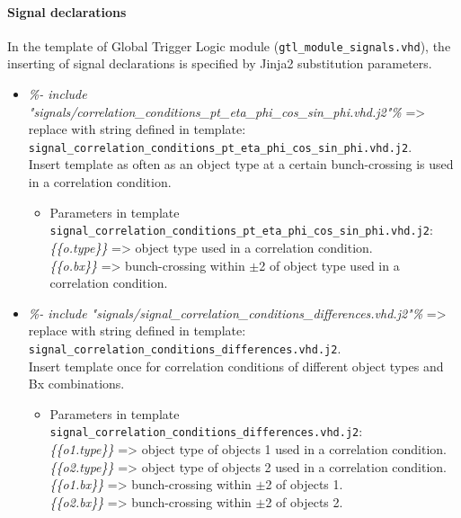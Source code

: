 \paragraph{Signal declarations}
In the template of Global Trigger Logic module (\texttt{gtl\_module\_signals.vhd}), the inserting of signal declarations is specified by Jinja2 substitution parameters.

\begin{itemize}
\item \textit{{\%- include "signals/correlation\_conditions\_pt\_eta\_phi\_cos\_sin\_phi.vhd.j2"\%}} => replace with string defined in template:\\
\texttt{signal\_correlation\_conditions\_pt\_eta\_phi\_cos\_sin\_phi.vhd.j2}.\\
Insert template as often as an object type at a certain bunch-crossing is used in a correlation condition.
    \begin{itemize}
    \item Parameters in template\\ \texttt{signal\_correlation\_conditions\_pt\_eta\_phi\_cos\_sin\_phi.vhd.j2}:\\
    \textit{\{\{o.type\}\}} => object type used in a correlation condition.\\ 
    \textit{\{\{o.bx\}\}} => bunch-crossing within $\pm$2 of object type used in a correlation condition.\\
    \end{itemize}
\end{itemize}
\begin{itemize}
\item \textit{{\%- include "signals/signal\_correlation\_conditions\_differences.vhd.j2"\%}} => replace with string defined in template:\\
\texttt{signal\_correlation\_conditions\_differences.vhd.j2}.\\
Insert template once for correlation conditions of different object types and Bx combinations.    
\begin{itemize}
    \item Parameters in template\\ \texttt{signal\_correlation\_conditions\_differences.vhd.j2}:\\
    \textit{\{\{o1.type\}\}} => object type of objects 1 used in a correlation condition.\\ 
    \textit{\{\{o2.type\}\}} => object type of objects 2 used in a correlation condition.\\ 
    \textit{\{\{o1.bx\}\}} => bunch-crossing within $\pm$2 of objects 1.\\
    \textit{\{\{o2.bx\}\}} => bunch-crossing within $\pm$2 of objects 2.\\
    \end{itemize}
\end{itemize}
